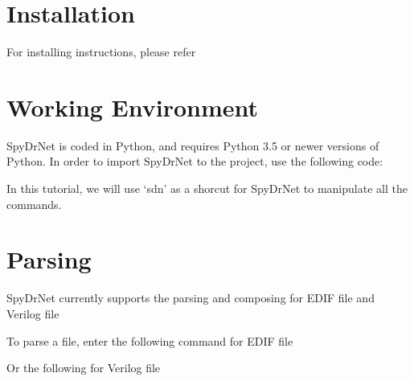 \documentclass[letterpaper,10pt,english,openany,oneside]{sphinxmanual}
\begin{document}
\section{Installation}
\label{\detokenize{tutorial:installation}}
For installing instructions, please refer 


\section{Working Environment}
\label{\detokenize{tutorial:working-environment}}
SpyDrNet is coded in Python, and requires Python 3.5 or newer versions of Python. In order to import SpyDrNet to the project, use the following code:

\begin{sphinxVerbatim}[commandchars=\\\{\}]
   
\end{sphinxVerbatim}

In this tutorial, we will use ‘sdn’ as a shorcut for SpyDrNet to manipulate all the commands.


\section{Parsing}
\label{\detokenize{tutorial:parsing}}
SpyDrNet currently supports the parsing and composing for EDIF file and Verilog file

To parse a file, enter the following command for EDIF file

\begin{sphinxVerbatim}[commandchars=\\\{\}]
  
\end{sphinxVerbatim}

Or the following for Verilog file

\begin{sphinxVerbatim}[commandchars=\\\{\}]
  
\end{sphinxVerbatim}
\end{document}
